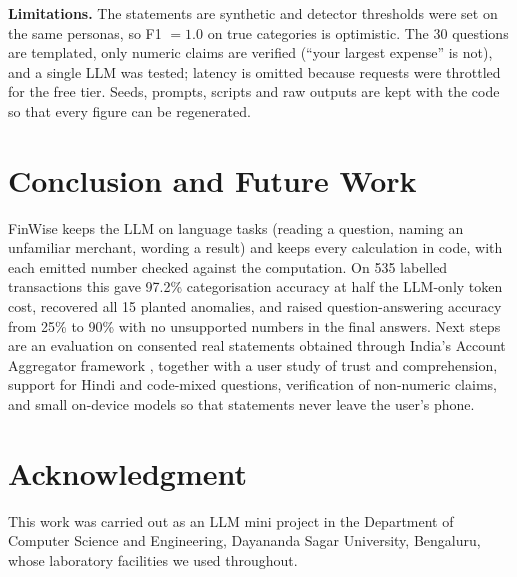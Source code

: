 \documentclass[conference]{IEEEtran}
\begin{document}
\textbf{Limitations.} The statements are synthetic and detector thresholds were set on the same personas, so F1 $=1.0$ on true categories is optimistic. The 30 questions are templated, only numeric claims are verified (``your largest expense'' is not), and a single LLM was tested; latency is omitted because requests were throttled for the free tier. Seeds, prompts, scripts and raw outputs are kept with the code so that every figure can be regenerated.

\section{Conclusion and Future Work}
FinWise keeps the LLM on language tasks (reading a question, naming an unfamiliar merchant, wording a result) and keeps every calculation in code, with each emitted number checked against the computation. On 535 labelled transactions this gave 97.2\% categorisation accuracy at half the LLM-only token cost, recovered all 15 planted anomalies, and raised question-answering accuracy from 25\% to 90\% with no unsupported numbers in the final answers. Next steps are an evaluation on consented real statements obtained through India's Account Aggregator framework \cite{rbi2016aa}, together with a user study of trust and comprehension, support for Hindi and code-mixed questions, verification of non-numeric claims, and small on-device models so that statements never leave the user's phone.

\section*{Acknowledgment}
This work was carried out as an LLM mini project in the Department of Computer Science and Engineering, Dayananda Sagar University, Bengaluru, whose laboratory facilities we used throughout.
\end{document}

